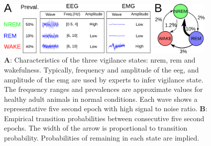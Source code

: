 \begin{figure}[h!]
  \centering   
    \includegraphics[width=0.95\textwidth]{figures/sleep_description.pdf}
  \caption{
  \textbf{A}: Characteristics of the three vigilance states: \gls{nrem}, \gls{rem} and wakefulness.
  Typically, frequency and amplitude of the \acrfull{eeg}, and amplitude of the \acrfull{emg} are used by experts to infer vigilance state.
  The frequency ranges and prevalences are approximate values for healthy adult animals in normal conditions.
  Each wave shows a representative five second epoch with high signal to noise ratio.
  \textbf{B}: Empirical transition probabilities between consecutive five second epochs. The width of the arrow is proportional to transition probability.
  Probabilities of remaining in each state are implied.
  \label{fig:sleep_description}
  }
\end{figure}


